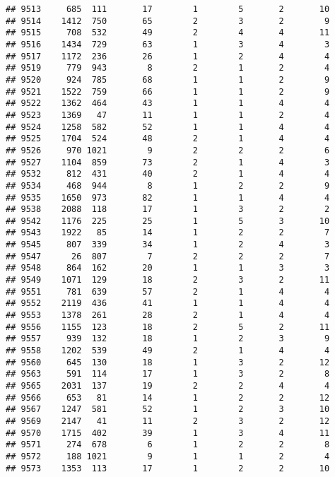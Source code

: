 \documentclass[]{article}
\begin{document}
\begin{verbatim}
## 9513     685  111       17        1        5       2       10
## 9514    1412  750       65        2        3       2        9
## 9515     708  532       49        2        4       4       11
## 9516    1434  729       63        1        3       4        3
## 9517    1172  236       26        1        2       4        4
## 9519     779  943        8        2        1       2        4
## 9520     924  785       68        1        1       2        9
## 9521    1522  759       66        1        1       2        9
## 9522    1362  464       43        1        1       4        4
## 9523    1369   47       11        1        1       2        4
## 9524    1258  582       52        1        1       4        4
## 9525    1704  524       48        2        1       4        4
## 9526     970 1021        9        2        2       2        6
## 9527    1104  859       73        2        1       4        3
## 9532     812  431       40        2        1       4        4
## 9534     468  944        8        1        2       2        9
## 9535    1650  973       82        1        1       4        4
## 9538    2088  118       17        1        3       2        2
## 9542    1176  225       25        1        5       3       10
## 9543    1922   85       14        1        2       2        7
## 9545     807  339       34        1        2       4        3
## 9547      26  807        7        2        2       2        7
## 9548     864  162       20        1        1       3        3
## 9549    1071  129       18        2        3       2       11
## 9551     781  639       57        2        1       4        4
## 9552    2119  436       41        1        1       4        4
## 9553    1378  261       28        2        1       4        4
## 9556    1155  123       18        2        5       2       11
## 9557     939  132       18        1        2       3        9
## 9558    1202  539       49        2        1       4        4
## 9560     645  130       18        1        3       2       12
## 9563     591  114       17        1        3       2        8
## 9565    2031  137       19        2        2       4        4
## 9566     653   81       14        1        2       2       12
## 9567    1247  581       52        1        2       3       10
## 9569    2147   41       11        2        3       2       12
## 9570    1715  402       39        1        3       4       11
## 9571     274  678        6        1        2       2        8
## 9572     188 1021        9        1        1       2        4
## 9573    1353  113       17        1        2       2       10

\end{verbatim}
\end{document}
